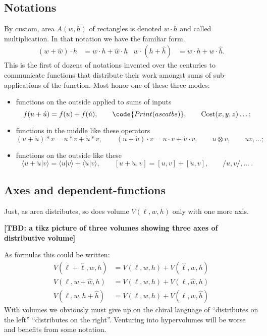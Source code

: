 \subsection{Notations}

By custom, area $A(w,h)$ of rectangles is denoted $w \cdot h$ and called
multiplication.  In that notation we have the familiar form.
\begin{align*}
    (w+\hat{w})\cdot h & = w \cdot h +\hat{w}\cdot h 
    &
    w\cdot (h+\hat{h}) & = w\cdot h + w\cdot \hat{h}.
\end{align*}
This is the first of dozens of notations invented over the centuries to communicate 
functions that distribute their work amongst sums of sub-applications of the function.  
Most honor one of these three modes:
\begin{itemize}
    \item functions on the outside applied to sums of inputs 
    \[ 
        f(u+\acute{u})=f(u)+f(\acute{u}),\qquad 
        \code{Print(as cat bs)},\qquad
        \text{Cost}
        (x,y,z)\ldots;
    \]

    \item functions in the middle like these operators 
    \[
        (u+\acute{u})*v=u*v+\acute{u}*v, \qquad 
        (u+\acute{u})\cdot v=u\cdot v+\acute{u}\cdot v,\qquad 
        u\otimes v, \qquad 
        uv,\ldots; 
    \]

    \item functions on the outside like these
    \[
        \langle u+\acute{u}|v\rangle=\langle u|v\rangle +\langle \acute{u}|v\rangle,\qquad 
        [u+\acute{u},v]=[u,v]+[\acute{u},v],\qquad  
        /u,v/,\ldots~.
    \]
    
\end{itemize}
   
\subsection{Axes and dependent-functions}
Just, as area distributes, so does volume $V(\ell,w,h)$ only with one more axis.
\begin{center}
    \textbf{[TBD: a tikz picture of three volumes showing three axes of distributive volume]}
\end{center}
As formulas this could be written:
\begin{align*}
    V(\ell+\hat{\ell},w,h) & = V(\ell,w,h)+V(\hat{\ell},w,h)\\
        V(\ell,w+\hat{w},h) & = V(\ell,w,h)+V(\ell,\hat{w},h)\\
        V(\ell,w,h+\hat{h}) & = V(\ell,w,h)+V(\ell,w,\hat{h})
\end{align*}
With volumes we obviously must give up on the chiral language of ``distributes on the left''
``distributes on the right''.   Venturing into hypervolumes will be worse and benefits from some notation.  

